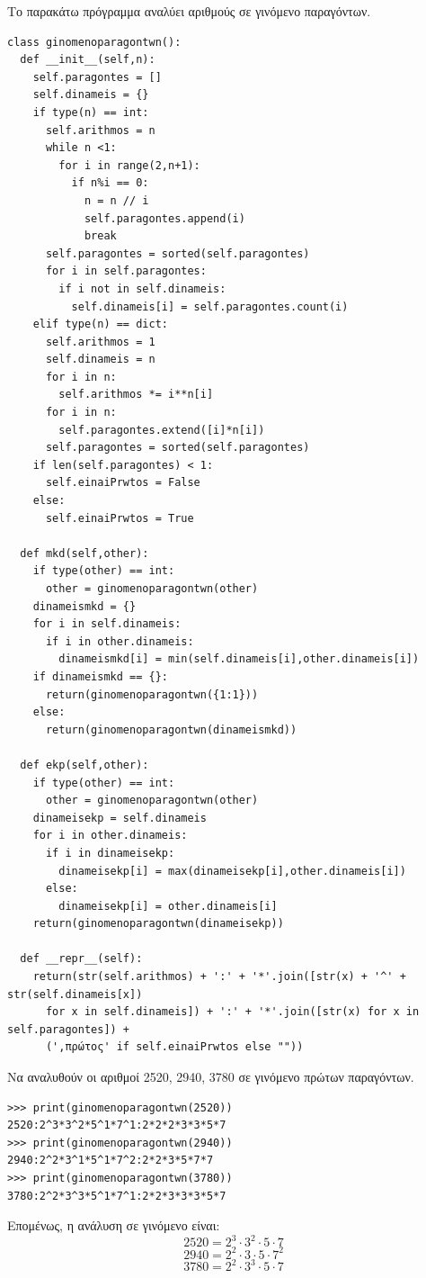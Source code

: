Το παρακάτω πρόγραμμα αναλύει αριθμούς σε γινόμενο παραγόντων.
\begin{lstlisting}
class ginomenoparagontwn():
  def __init__(self,n):
    self.paragontes = []
    self.dinameis = {}
    if type(n) == int:
      self.arithmos = n
      while n <1:
        for i in range(2,n+1):
          if n%i == 0:
            n = n // i
            self.paragontes.append(i)
            break
      self.paragontes = sorted(self.paragontes)
      for i in self.paragontes:
        if i not in self.dinameis:
          self.dinameis[i] = self.paragontes.count(i)
    elif type(n) == dict:
      self.arithmos = 1
      self.dinameis = n
      for i in n:
        self.arithmos *= i**n[i]
      for i in n:
        self.paragontes.extend([i]*n[i])
      self.paragontes = sorted(self.paragontes)
    if len(self.paragontes) < 1:
      self.einaiPrwtos = False
    else:
      self.einaiPrwtos = True
  
  def mkd(self,other):
    if type(other) == int:
      other = ginomenoparagontwn(other)
    dinameismkd = {}
    for i in self.dinameis:
      if i in other.dinameis:
        dinameismkd[i] = min(self.dinameis[i],other.dinameis[i])
    if dinameismkd == {}:
      return(ginomenoparagontwn({1:1}))
    else:
      return(ginomenoparagontwn(dinameismkd))
      
  def ekp(self,other):
    if type(other) == int:
      other = ginomenoparagontwn(other)
    dinameisekp = self.dinameis
    for i in other.dinameis:
      if i in dinameisekp:
        dinameisekp[i] = max(dinameisekp[i],other.dinameis[i])
      else:
        dinameisekp[i] = other.dinameis[i]
    return(ginomenoparagontwn(dinameisekp))
    
  def __repr__(self):
    return(str(self.arithmos) + ':' + '*'.join([str(x) + '^' + str(self.dinameis[x]) 
      for x in self.dinameis]) + ':' + '*'.join([str(x) for x in self.paragontes]) + 
      (',πρώτος' if self.einaiPrwtos else ""))
\end{lstlisting}
\begin{exercise}
 Να αναλυθούν οι αριθμοί 2520, 2940, 3780 σε γινόμενο πρώτων παραγόντων. \end{exercise}

\begin{lstlisting}
>>> print(ginomenoparagontwn(2520))
2520:2^3*3^2*5^1*7^1:2*2*2*3*3*5*7
>>> print(ginomenoparagontwn(2940))
2940:2^2*3^1*5^1*7^2:2*2*3*5*7*7
>>> print(ginomenoparagontwn(3780))
3780:2^2*3^3*5^1*7^1:2*2*3*3*3*5*7
\end{lstlisting}
Επομένως, η ανάλυση σε γινόμενο είναι:
$$2520 = 2^3\cdot 3^2\cdot 5\cdot 7$$
$$2940 = 2^2\cdot 3\cdot 5\cdot 7^2$$
$$3780 = 2^2\cdot 3^3\cdot 5\cdot 7$$

